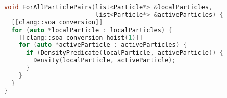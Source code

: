 \begin{lstlisting}[language=C++,
                   label=algorithm:annotations:example,
                   caption=Annotated blueprint code,
                   basicstyle=\footnotesize]
void ForAllParticlePairs(list<Particle*> &localParticles,
                         list<Particle*> &activeParticles) {
  [[clang::soa_conversion]]
  for (auto *localParticle : localParticles) {
    [[clang::soa_conversion_hoist(1)]]
    for (auto *activeParticle : activeParticles) {
      if (DensityPredicate(localParticle, activeParticle)) {
        Density(localParticle, activeParticle);
      }
    }
  }
}
\end{lstlisting}
